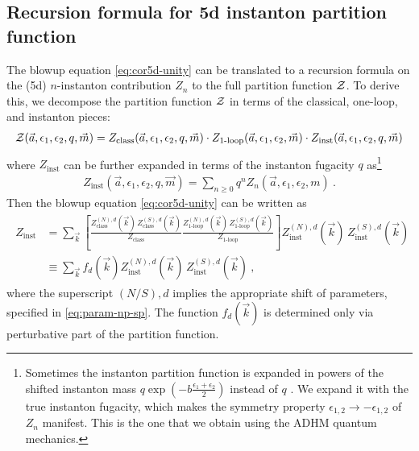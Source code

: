 \documentclass[letterpaper, 11pt]{article}
\def\CZ{{\cal Z}}
\def\e{\epsilon}
\begin{document}
\subsection{Recursion formula for 5d instanton partition function}
\label{subsec:recursion}

The blowup equation \eqref{eq:cor5d-unity} can be translated to a recursion formula on the (5d) $n$-instanton contribution $Z_n$ to the full partition function $\CZ$.
To derive this, we decompose the partition function $\CZ$ in terms of the classical, one-loop, and instanton pieces: 
\begin{align}
  \CZ(\vec{a}, \e_1, \e_2, q, \vec{m}) = Z_{\textrm{class}}(\vec{a}, \e_1, \e_2, q, \vec{m}) \cdot  Z_{\textrm{1-loop}} (\vec{a}, \e_1, \e_2, \vec{m}) \cdot Z_{\textrm{inst}}(\vec{a}, \e_1, \e_2, q, \vec{m})
 \end{align}
where $Z_\text{inst}$ can be further expanded in terms of the instanton fugacity $q$ as\footnote{Sometimes the instanton partition function is expanded in powers of the shifted instanton mass $q \exp (-b \frac{\e_1+\e_2}{2})$ instead of $q$ \cite{Nakajima:2005fg, Gottsche:2006bm, Keller:2012da}. We expand it with the true instanton fugacity, which makes the symmetry property $\e_{1, 2} \to - \e_{1, 2}$ of $Z_n$ manifest. This is the one that we obtain using the ADHM quantum mechanics.}
\begin{align}
 Z_{\textrm{inst}} (\vec{a}, \e_1, \e_2, q, \vec{m}) = \sum_{n \ge 0} q^n Z_n (\vec{a}, \e_1, \e_2, m) \ . 
\end{align}
Then the blowup equation \eqref{eq:cor5d-unity} can be written as
\begin{align}
  \label{eq:recur-inst}
  \begin{split}
 Z_{\textrm{inst}} &= \sum_{\vec{k}} \left[ \frac{Z^{(N), d}_{\textrm{class}}(\vec{k}) \, Z^{(S), d}_{\textrm{class}}(\vec{k})}{Z_{\textrm{class}}}  \frac{Z^{(N), d}_{\textrm{1-loop}}(\vec{k})\, Z^{(S), d}_{\textrm{1-loop}}(\vec{k})}{Z_{\textrm{1-loop}}} \right] Z^{(N), d}_{\textrm{inst}}(\vec{k})\, Z^{(S), d}_{\textrm{inst}}(\vec{k}) \\
  &\equiv  \sum_{\vec{k}} f_d(\vec{k}) Z^{(N), d}_{\textrm{inst}}(\vec{k})\, Z^{(S), d}_{\textrm{inst}}(\vec{k}) \ , 
  \end{split}
\end{align}
where the superscript $(N/S),d$ implies the appropriate shift of parameters, specified in \eqref{eq:param-np-sp}. The function $f_d(\vec{k})$ is determined only via perturbative part of the partition function. 
\end{document}
